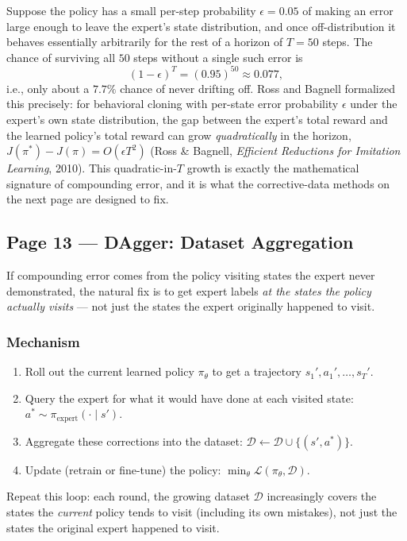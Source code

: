 Suppose the policy has a small per-step probability $\epsilon = 0.05$ of making an error large enough to leave the expert's state distribution, and once off-distribution it behaves essentially arbitrarily for the rest of a horizon of $T=50$ steps. The chance of surviving all $50$ steps without a single such error is
\[
(1-\epsilon)^T = (0.95)^{50} \approx 0.077,
\]
i.e., only about a $7.7\%$ chance of never drifting off. Ross and Bagnell formalized this precisely: for behavioral cloning with per-state error probability $\epsilon$ under the expert's own state distribution, the gap between the expert's total reward and the learned policy's total reward can grow \emph{quadratically} in the horizon, $J(\pi^*) - J(\pi) = O(\epsilon T^2)$ (Ross \& Bagnell, \emph{Efficient Reductions for Imitation Learning}, 2010). This quadratic-in-$T$ growth is exactly the mathematical signature of compounding error, and it is what the corrective-data methods on the next page are designed to fix.

\subsection*{Page 13 --- DAgger: Dataset Aggregation}

If compounding error comes from the policy visiting states the expert never demonstrated, the natural fix is to get expert labels \emph{at the states the policy actually visits} --- not just the states the expert originally happened to visit.

\subsubsection*{Mechanism}

\begin{enumerate}
\item Roll out the current learned policy $\pi_\theta$ to get a trajectory $s_1', a_1', \dots, s_T'$.
\item Query the expert for what it would have done at each visited state: $a^* \sim \pi_{\text{expert}}(\cdot \mid s')$.
\item Aggregate these corrections into the dataset: $\mathcal{D} \leftarrow \mathcal{D} \cup \{(s', a^*)\}$.
\item Update (retrain or fine-tune) the policy: $\min_\theta \mathcal{L}(\pi_\theta, \mathcal{D})$.
\end{enumerate}
Repeat this loop: each round, the growing dataset $\mathcal D$ increasingly covers the states the \emph{current} policy tends to visit (including its own mistakes), not just the states the original expert happened to visit.

